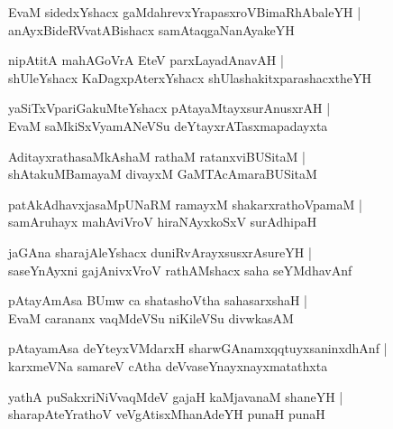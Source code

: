 \documentclass[twoside,12pt,openright]{book}
\newcounter{shloka}[chapter]
\begin{document}
\begin{shloka}%
EvaM sidedxYshacx gaMdahrevxYrapasxroVBimaRhAbaleYH |\\
anAyxBideRVvatABishacx samAtaqgaNanAyakeYH
\end{shloka}

\begin{shloka}%
nipAtitA mahAGoVrA EteV parxLayadAnavAH |\\
shUleYshacx KaDagxpAterxYshacx shUlashakitxparashacxtheYH 
\end{shloka}

\begin{shloka}%
yaSiTxVpariGakuMteYshacx pAtayaMtayxsurAnusxrAH |\\
EvaM saMkiSxVyamANeVSu deYtayxrATasxmapadayxta
\end{shloka}

\begin{shloka}%
AditayxrathasaMkAshaM rathaM ratanxviBUSitaM |\\
shAtakuMBamayaM divayxM GaMTAcAmaraBUSitaM
\end{shloka}

\begin{shloka}%
patAkAdhavxjasaMpUNaRM ramayxM shakarxrathoVpamaM |\\
samAruhayx mahAviVroV hiraNAyxkoSxV surAdhipaH
\end{shloka}

\begin{shloka}%
jaGAna sharajAleYshacx duniRvArayxsusxrAsureYH |\\
saseYnAyxni gajAnivxVroV rathAMshacx saha seYMdhavAnf 
\end{shloka}

\begin{shloka}%
pAtayAmAsa BUmw ca shatashoVtha sahasarxshaH |\\
EvaM carananx vaqMdeVSu niKileVSu divwkasAM 
\end{shloka}

\begin{shloka}%
pAtayamAsa deYteyxVMdarxH sharwGAnamxqqtuyxsaninxdhAnf |\\
karxmeVNa samareV cAtha deVvaseYnayxnayxmatathxta
\end{shloka}

\begin{shloka}%
yathA puSakxriNiVvaqMdeV gajaH kaMjavanaM shaneYH |\\
sharapAteYrathoV veVgAtisxMhanAdeYH punaH punaH 
\end{shloka}
\end{document}
